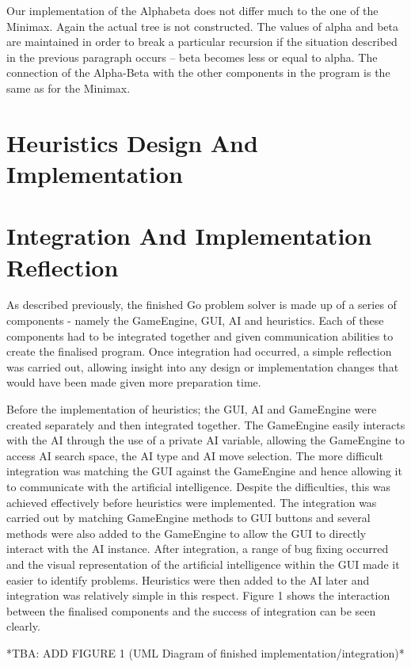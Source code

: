 \documentclass{l3proj}
\begin{document}
Our implementation of the Alphabeta does not differ much to the one of the Minimax. Again the actual tree is not constructed. The values of alpha and beta are maintained in order to break a particular recursion if the situation described in the previous paragraph occurs – beta becomes less or equal to alpha. The connection of the Alpha-Beta with the other components in the program is the same as for the Minimax.

\section{Heuristics Design And Implementation}

\section{Integration And Implementation Reflection}

As described previously, the finished Go problem solver is made up of a series of components - namely the GameEngine, GUI, AI and heuristics. Each of these components had to be integrated together and given communication abilities to create the finalised program. Once integration had occurred, a simple reflection was carried out, allowing insight into any design or implementation changes that would have been made given more preparation time.

Before the implementation of heuristics; the GUI, AI and GameEngine were created separately and then integrated together. The GameEngine easily interacts with the AI through the use of a private AI variable, allowing the GameEngine to access AI search space, the AI type and AI move selection. The more difficult integration was matching the GUI against the GameEngine and hence allowing it to communicate with the artificial intelligence. Despite the difficulties, this was achieved effectively before heuristics were implemented. The integration was carried out by matching GameEngine methods to GUI buttons and several methods were also added to the GameEngine to allow the GUI to directly interact with the AI instance. After integration, a range of bug fixing occurred and the visual representation of the artificial intelligence within the GUI made it easier to identify problems. Heuristics were then added to the AI later and integration was relatively simple in this respect. Figure 1 shows the interaction between the finalised components and the success of integration can be seen clearly.

*TBA: ADD FIGURE 1 (UML Diagram of finished implementation/integration)*
\end{document}

